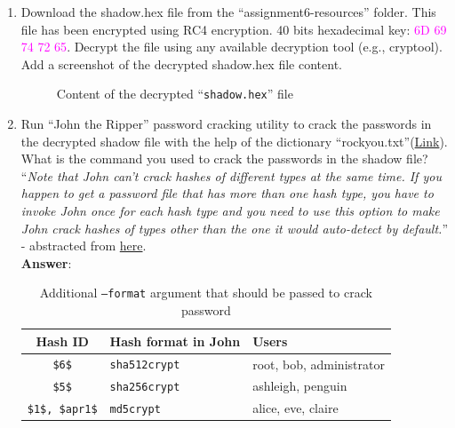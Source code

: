 \documentclass[11pt,letterpaper]{article}
\begin{document}
	\begin{enumerate}
		\item Download the shadow.hex file from the ``assignment6-resources'' folder. This file has been encrypted using RC4 encryption. 40 bits hexadecimal key: \textcolor{magenta}{6D 69 74 72 65}. Decrypt the file using any available decryption tool (e.g., cryptool). Add a screenshot of the decrypted shadow.hex file content.
		
		\begin{figure}[h]
			\centering
		\caption{Content of the decrypted ``{\tt shadow.hex}'' file}
		\end{figure}
		
		
		
		\item Run ``John the Ripper'' password cracking utility to crack the passwords in the decrypted shadow file with the help of the dictionary ``rockyou.txt''(\href{https://uniofmora-my.sharepoint.com/:t:/g/personal/scharles_uom_lk/EQvMHge3CrZNpeE7WGXpapoBslFMMcgHih0teepNIwDVIg?e=9aEjJd}{Link}). What is the command you used to crack the passwords in the shadow file?\\		
		
		``\textit{Note that John can't crack hashes of different
			types at the same time.  If you happen to get a password file that has more than one hash type, you have to invoke John once for each hash type and you need to use this option to make John crack hashes of types other than the one it would auto-detect by default.}'' - abstracted from \href{https://github.com/openwall/john/blob/bleeding-jumbo/doc/OPTIONS}{here}.\\

		\textbf{\Large Answer}:
		\begin{table}[!h]
			\centering
			\begin{tabular}{|c | l | l |}
				\hline
		\textbf{Hash ID} & \textbf{Hash format in John} & \textbf{Users}\\\hline
		{\tt \$6\$} & {\tt sha512crypt} & root, bob, administrator\\
		{\tt \$5\$} & {\tt sha256crypt} & ashleigh, penguin\\
		{\tt \$1\$, \$apr1\$} & {\tt md5crypt} & alice, eve, claire\\
		\hline\hline		
			\end{tabular}
		\caption{Additional {\tt --format} argument that should be passed to crack password}
		\end{table}
		

\end{enumerate}
\end{document}
